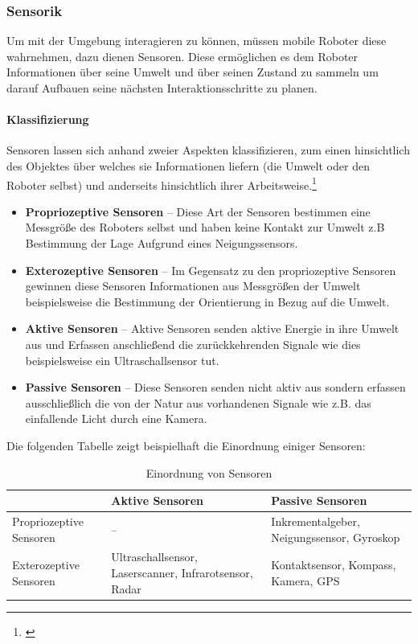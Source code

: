 \subsubsection{Sensorik}
Um mit der Umgebung interagieren zu können, müssen mobile Roboter diese wahrnehmen, dazu dienen Sensoren. Diese ermöglichen es dem Roboter Informationen über seine Umwelt und über seinen Zustand zu sammeln um darauf Aufbauen seine nächsten Interaktionsschritte zu planen.
\paragraph{Klassifizierung}
Sensoren lassen sich anhand zweier Aspekten klassifizieren, zum einen hinsichtlich des Objektes über welches sie Informationen liefern (die Umwelt oder den Roboter selbst) und anderseits hinsichtlich ihrer Arbeitsweise.\footnote{\citep[vgl.][Mobile Roboter, Seite 24]{Hertzberg.MobileRoboter}\label{note6}}
\begin{itemize}
	\item{\textbf{Propriozeptive Sensoren}} -- Diese Art der Sensoren bestimmen eine Messgröße des Roboters selbst und haben keine \glqq{}Kontakt\grqq{} zur Umwelt z.B Bestimmung der Lage Aufgrund eines Neigungssensors.
	\item{\textbf{Exterozeptive Sensoren}} -- Im Gegensatz zu den propriozeptive Sensoren gewinnen diese Sensoren Informationen aus Messgrößen der Umwelt beispielsweise die Bestimmung der Orientierung in Bezug auf die Umwelt.
	\item{\textbf{Aktive Sensoren}} -- Aktive Sensoren senden aktive Energie in ihre Umwelt aus und Erfassen anschließend die zurückkehrenden Signale wie dies beispielsweise ein Ultraschallsensor tut.
	\item{\textbf{Passive Sensoren}} -- Diese Sensoren senden nicht aktiv aus sondern erfassen ausschließlich die von der Natur aus vorhandenen Signale wie z.B. das einfallende Licht durch eine Kamera.
\end{itemize}
Die folgenden Tabelle zeigt beispielhaft die Einordnung einiger Sensoren:
\begin{table}[ht]
	\begin{tabular}{|p{}|p{}|p{}|} \hline
		     	                & Aktive Sensoren      & Passive Sensoren   \\ \hline
		Propriozeptive Sensoren & 
			-- & 
			Inkrementalgeber, \newline Neigungssensor, \newline Gyroskop   \\ \hline
		Exterozeptive Sensoren  & 
			Ultraschallsensor,  \newline Laserscanner, \newline Infrarotsensor, \newline Radar    & 
			Kontaktsensor, \newline Kompass, \newline Kamera, \newline GPS      \\ \hline 
	\end{tabular}
	\centering
	\caption[Einordnung von Sensoren]{Einordnung von Sensoren}
\end{table}

